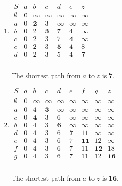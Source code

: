 \documentclass[a4paper]{article}
\begin{document}
	\begin{enumerate}[label = \alph*)]
		\item 
		      $\begin{array}{c|cccccc}
				      S         & a          & b          & c          & d          & e          & z          \\
				      \hline
				      \emptyset & \textbf{0} & \infty     & \infty     & \infty     & \infty     & \infty     \\
				      a         & 0          & \textbf{2} & 3          & \infty     & \infty     & \infty     \\
				      b         & 0          & 2          & \textbf{3} & 7          & 4          & \infty     \\
				      c         & 0          & 2          & 3          & 7          & \textbf{4} & \infty     \\
				      e         & 0          & 2          & 3          & \textbf{5} & 4          & 8          \\
				      d         & 0          & 2          & 3          & 5          & 4          & \textbf{7} \\
			      \end{array}$\\ \\
		      The shortest path from $a$ to $z$ is \textbf{7}.
		\item
		      $\begin{array}{c|cccccccc}
				      S         & a          & b          & c          & d          & e          & f           & g           & z           \\
				      \hline
				      \emptyset & \textbf{0} & \infty     & \infty     & \infty     & \infty     & \infty      & \infty      & \infty      \\
				      a         & 0          & 4          & \textbf{3} & \infty     & \infty     & \infty      & \infty      & \infty      \\
				      c         & 0          & \textbf{4} & 3          & 6          & \infty     & \infty      & \infty      & \infty      \\
				      b         & 0          & 4          & 3          & \textbf{6} & \infty     & \infty      & \infty      & \infty      \\
				      d         & 0          & 4          & 3          & 6          & \textbf{7} & 11          & \infty      & \infty      \\
				      e         & 0          & 4          & 3          & 6          & 7          & \textbf{11} & 12          & \infty      \\
				      f         & 0          & 4          & 3          & 6          & 7          & 11          & \textbf{12} & 18          \\
				      g         & 0          & 4          & 3          & 6          & 7          & 11          & 12          & \textbf{16} \\
			      \end{array}$\\ \\
		      The shortest path from $a$ to $z$ is \textbf{16}.
	\end{enumerate}
\end{document}

